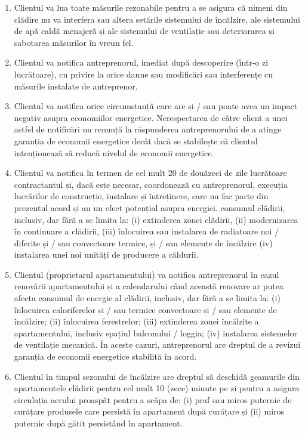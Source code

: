 \begin{multicols}{2}
\begin{enumerate}
\item Clientul va lua toate măsurile rezonabile pentru a se asigura că nimeni din clădire nu va interfera sau altera setările sistemului de încălzire, ale sistemului de apă caldă menajeră și ale sistemului de ventilație sau deteriorarea și sabotarea măsurilor în vreun fel.
\item Clientul va notifica antreprenorul, imediat după descoperire (într-o zi lucrătoare), cu privire la orice daune sau modificări sau interferențe cu măsurile instalate de antreprenor.
\item Clientul va notifica orice circumstanță care are și / sau poate avea un impact negativ asupra economiilor energetice. Nerespectarea de către client a unei astfel de notificări nu renunță la răspunderea antreprenorului de a atinge garanția de economii energetice decât dacă se stabilește că clientul intenționează să reducă nivelul de economii energetice.
\item Clientul va notifica în termen de cel mult 20 de douăzeci de zile lucrătoare contractantul și, dacă este necesar, coordonează cu antreprenorul, execuția lucrărilor de construcție, instalare și întreținere, care nu fac parte din prezentul acord și au un efect potențial asupra energiei. consumul clădirii, inclusiv, dar fără a se limita la: (i) extinderea zonei clădirii, (ii) modernizarea în continuare a clădirii, (iii) înlocuirea sau instalarea de radiatoare noi / diferite și / sau convectoare termice, și / sau elemente de încălzire (iv) instalarea unei noi unități de producere a căldurii.
\item Clientul (proprietarul apartamentului) va notifica antreprenorul în cazul renovării apartamentului și a calendarului când această renovare ar putea afecta consumul de energie al clădirii, inclusiv, dar fără a se limita la: (i) înlocuirea caloriferelor și / sau termice convectoare și / sau elemente de încălzire; (ii) înlocuirea ferestrelor; (iii) extinderea zonei încălzite a apartamentului, inclusiv spațiul balconului / loggia; (iv) instalarea sistemelor de ventilație mecanică. În aceste cazuri, antreprenorul are dreptul de a revizui garanția de economii energetice stabilită în acord.
\item Clientul în timpul sezonului de încălzire are dreptul să deschidă geamurile din apartamentele clădirii pentru cel mult 10 (zece) minute pe zi pentru a asigura circulația aerului proaspăt pentru a scăpa de: (i) praf sau miros puternic de curățare produsele care persistă în apartament după curățare și (ii) miros puternic după gătit persistând în apartament.

\end{enumerate}
\end{multicols}
